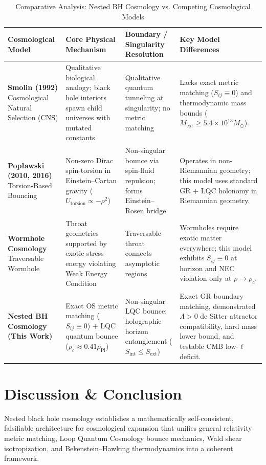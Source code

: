 \documentclass[11pt,a4paper]{article}
\begin{document}
\begin{table}[H]
\centering
\caption{Comparative Analysis: Nested BH Cosmology vs. Competing Cosmological Models}\label{table:competing_models}
\begin{tabular}{p{3.0cm}p{3.6cm}p{4.0cm}p{3.6cm}}
\toprule
\textbf{Cosmological Model} & \textbf{Core Physical Mechanism} & \textbf{Boundary / Singularity Resolution} & \textbf{Key Model Differences} \\
\midrule
\textbf{Smolin (1992) \cite{smolin1992}} Cosmological Natural Selection (CNS) & Qualitative biological analogy; black hole interiors spawn child universes with mutated constants & Qualitative quantum tunneling at singularity; no metric matching & Lacks exact metric matching ($S_{ij} \equiv 0$) and thermodynamic mass bounds ($M_{\text{ext}} \ge 5.4 \times 10^{13} M_\odot$). \\
\midrule
\textbf{Pop{\l}awski (2010, 2016) \cite{poplawski2010, poplawski2016}} Torsion-Based Bouncing & Non-zero Dirac spin-torsion in Einstein--Cartan gravity ($U_{\text{torsion}} \propto -\rho^2$) & Non-singular bounce via spin-fluid repulsion; forms Einstein--Rosen bridge & Operates in non-Riemannian geometry; this model uses standard GR + LQC holonomy in Riemannian geometry. \\
\midrule
\textbf{Wormhole Cosmology \cite{gaztanaga2022}} Traversable Wormhole & Throat geometries supported by exotic stress-energy violating Weak Energy Condition & Traversable throat connects asymptotic regions & Wormholes require exotic matter everywhere; this model exhibits $S_{ij} \equiv 0$ at horizon and NEC violation only at $\rho \to \rho_c$. \\
\midrule
\textbf{Nested BH Cosmology (This Work)} & Exact OS metric matching ($S_{ij} \equiv 0$) + LQC quantum bounce ($\rho_c \approx 0.41 \rho_{\text{Pl}}$) & Non-singular LQC bounce; holographic horizon entanglement ($S_{\text{int}} \le S_{\text{ext}}$) & Exact GR boundary matching, demonstrated $\Lambda > 0$ de Sitter attractor compatibility, hard mass lower bound, and testable CMB low-$\ell$ deficit. \\
\bottomrule
\end{tabular}
\end{table}

\section{Discussion \& Conclusion}\label{sec:conclusion}
Nested black hole cosmology establishes a mathematically self-consistent, falsifiable architecture for cosmological expansion that unifies general relativity metric matching, Loop Quantum Cosmology bounce mechanics, Wald shear isotropization, and Bekenstein--Hawking thermodynamics into a coherent framework.
\end{document}
